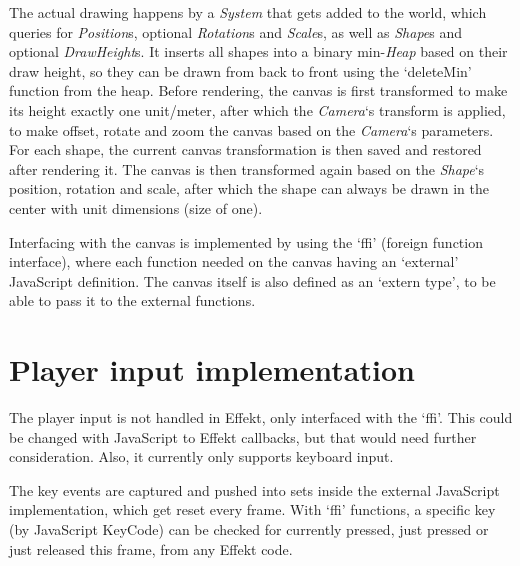 The actual drawing happens by a \textit{System} that gets added to the world, which queries for \textit{Position}s, optional \textit{Rotation}s and \textit{Scale}s, as well as \textit{Shape}s and optional \textit{DrawHeight}s. It inserts all shapes into a binary min-\textit{Heap} based on their draw height, so they can be drawn from back to front using the `deleteMin' function from the heap. Before rendering, the canvas is first transformed to make its height exactly one unit/meter, after which the \textit{Camera}`s transform is applied, to make offset, rotate and zoom the canvas based on the \textit{Camera}`s parameters. For each shape, the current canvas transformation is then saved and restored after rendering it. The canvas is then transformed again based on the \textit{Shape}`s position, rotation and scale, after which the shape can always be drawn in the center with unit dimensions (size of one).

Interfacing with the canvas is implemented by using the `ffi' (foreign function interface), where each function needed on the canvas having an `external' JavaScript definition. The canvas itself is also defined as an `extern type', to be able to pass it to the external functions.

\section{Player input implementation}

The player input is not handled in Effekt, only interfaced with the `ffi'. This could be changed with JavaScript to Effekt callbacks, but that would need further consideration. Also, it currently only supports keyboard input.

The key events are captured and pushed into sets inside the external JavaScript implementation, which get reset every frame. With `ffi' functions, a specific key (by JavaScript KeyCode) can be checked for currently pressed, just pressed or just released this frame, from any Effekt code.
